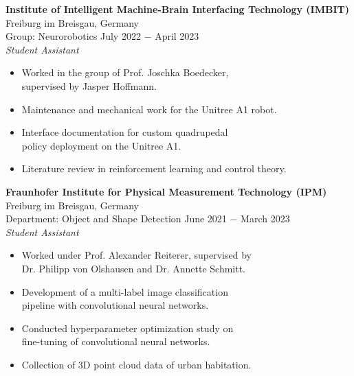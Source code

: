 \documentclass{article}
\begin{document}
\noindent \textbf{Institute of Intelligent Machine-Brain Interfacing Technology (IMBIT)}  \hfill Freiburg im Breisgau, Germany \\
\noindent Group: Neurorobotics  \hfill July 2022 $-$ April 2023\\
\textit{Student Assistant}
\begin{itemize}[noitemsep,nolistsep,leftmargin=*]
    \item Worked in the group of Prof. Joschka Boedecker, \\
    supervised by Jasper Hoffmann.
    \item Maintenance and mechanical work for the Unitree A1 robot.
    \item Interface documentation for custom quadrupedal \\
    policy deployment on the Unitree A1.
    \item Literature review in reinforcement learning and control theory. \\
\end{itemize}

\noindent \textbf{Fraunhofer Institute for Physical Measurement Technology (IPM)}  \hfill Freiburg im Breisgau, Germany \\
\noindent Department: Object and Shape Detection  \hfill June 2021 $-$ March 2023\\
\textit{Student Assistant}
\begin{itemize}[noitemsep,nolistsep,leftmargin=*]
    \item Worked under Prof. Alexander Reiterer, supervised by \\
    Dr. Philipp von Olshausen and Dr. Annette Schmitt.
    \item Development of a multi-label image classification \\
    pipeline with convolutional neural networks.
    \item Conducted hyperparameter optimization study on \\ 
    fine-tuning of convolutional neural networks. 
    \item Collection of 3D point cloud data of urban habitation.\\
\end{itemize}
\end{document}
